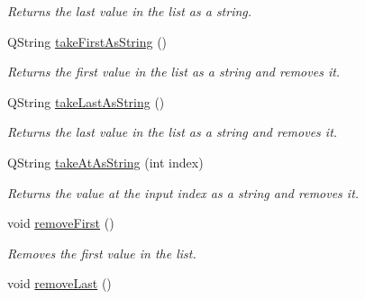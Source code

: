 \begin{DoxyCompactItemize}
\begin{DoxyCompactList}\small\item\em Returns the last value in the list as a string. \end{DoxyCompactList}\item 
\hypertarget{class_picto_1_1_analysis_variable_list_ae3b95b1be65eea1550c7795bf64641d9}{Q\-String \hyperlink{class_picto_1_1_analysis_variable_list_ae3b95b1be65eea1550c7795bf64641d9}{take\-First\-As\-String} ()}\label{class_picto_1_1_analysis_variable_list_ae3b95b1be65eea1550c7795bf64641d9}

\begin{DoxyCompactList}\small\item\em Returns the first value in the list as a string and removes it. \end{DoxyCompactList}\item 
\hypertarget{class_picto_1_1_analysis_variable_list_aee0234e634a14bff22f4c0582aa7a615}{Q\-String \hyperlink{class_picto_1_1_analysis_variable_list_aee0234e634a14bff22f4c0582aa7a615}{take\-Last\-As\-String} ()}\label{class_picto_1_1_analysis_variable_list_aee0234e634a14bff22f4c0582aa7a615}

\begin{DoxyCompactList}\small\item\em Returns the last value in the list as a string and removes it. \end{DoxyCompactList}\item 
\hypertarget{class_picto_1_1_analysis_variable_list_a617dfa92cfe1dab3615182e79d43021c}{Q\-String \hyperlink{class_picto_1_1_analysis_variable_list_a617dfa92cfe1dab3615182e79d43021c}{take\-At\-As\-String} (int index)}\label{class_picto_1_1_analysis_variable_list_a617dfa92cfe1dab3615182e79d43021c}

\begin{DoxyCompactList}\small\item\em Returns the value at the input index as a string and removes it. \end{DoxyCompactList}\item 
\hypertarget{class_picto_1_1_analysis_variable_list_a6e630b792ce393485bce8e84b2d0767b}{void \hyperlink{class_picto_1_1_analysis_variable_list_a6e630b792ce393485bce8e84b2d0767b}{remove\-First} ()}\label{class_picto_1_1_analysis_variable_list_a6e630b792ce393485bce8e84b2d0767b}

\begin{DoxyCompactList}\small\item\em Removes the first value in the list. \end{DoxyCompactList}\item 
\hypertarget{class_picto_1_1_analysis_variable_list_a3882038eec0b3527181c2c2f6b98142f}{void \hyperlink{class_picto_1_1_analysis_variable_list_a3882038eec0b3527181c2c2f6b98142f}{remove\-Last} ()}\label{class_picto_1_1_analysis_variable_list_a3882038eec0b3527181c2c2f6b98142f}


\end{DoxyCompactItemize}
